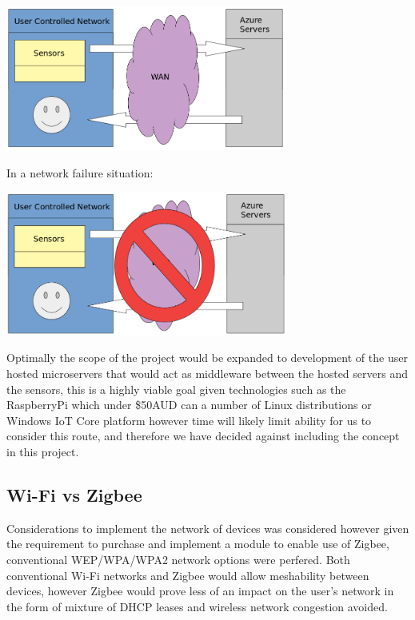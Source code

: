 \documentclass{article}
\newcounter{num}
\begin{document}
            \begin{center}
                \includegraphics[width=350px]{Images/CurrentSystemDiagram.jpg}
            \end{center}
            In a network failure situation:
            \begin{center}
                \includegraphics[width=350px]{Images/CurrentSystemDiagramAlternate.jpg}
            \end{center}

            Optimally the scope of the project would be expanded to development of
            the user hosted microservers that would act as middleware between
            the hosted servers and the sensors, this is a highly viable goal given
            technologies such as the RaspberryPi\cite{RPI} which under \$50AUD 
            can a number of Linux distributions or Windows IoT Core platform however
            time will likely limit ability for us to consider this route, and therefore
            we have decided against including the concept in this project.
        
        \subsection{Wi-Fi vs Zigbee}
            Considerations to implement the network of devices was considered however 
            given the requirement to purchase and implement a module
            to enable use of Zigbee, conventional WEP/WPA/WPA2 network options 
            were perfered. Both conventional Wi-Fi networks and Zigbee would allow
            meshability between devices, however Zigbee would prove less of an impact on the user's
            network in the form of mixture of DHCP leases and wireless network congestion avoided.
\end{document}
